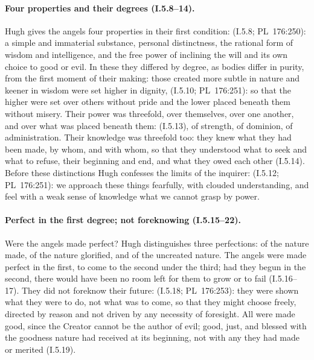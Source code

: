 \paragraph{Four properties and their degrees (I.5.8--14).} Hugh gives the
angels four properties in their first condition:  (I.5.8; PL~176:250): a simple and immaterial substance, personal
distinctness, the rational form of wisdom and intelligence, and the free
power of inclining the will and its own choice to good or evil. In these
they differed by degree, as bodies differ in purity, from the first moment
of their making: those created more subtle in nature and keener in wisdom
were set higher in dignity,  (I.5.10; PL~176:251): so that the higher were
set over others without pride and the lower placed beneath them without
misery. Their power was threefold, over themselves, over one another, and
over what was placed beneath them:  (I.5.13), of strength, of
dominion, of administration. Their knowledge was threefold too: they knew
what they had been made, by whom, and with whom, so that they understood
what to seek and what to refuse, their beginning and end, and what they
owed each other (I.5.14). Before these distinctions Hugh confesses the
limits of the inquirer:  (I.5.12; PL~176:251): we approach these things fearfully,
with clouded understanding, and feel with a weak sense of knowledge what we
cannot grasp by power.

\paragraph{Perfect in the first degree; not foreknowing (I.5.15--22).} Were
the angels made perfect? Hugh distinguishes three perfections: of the
nature made, of the nature glorified, and of the uncreated nature. The
angels were made perfect in the first, to come to the second under the
third; had they begun in the second, there would have been no room left for
them to grow or to fail (I.5.16--17). They did not foreknow their future:
 (I.5.18; PL~176:253): they were shown what they were to do, not
what was to come, so that they might choose freely, directed by reason and
not driven by any necessity of foresight. All were made good, since the
Creator cannot be the author of evil; good, just, and blessed with the
goodness nature had received at its beginning, not with any they had made
or merited (I.5.19).

